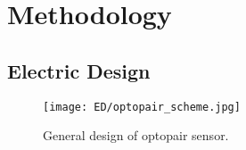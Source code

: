 \chapter{Methodology}
\label{chapter:methodology}


\section{Electric Design}
\begin{figure}[H]
    \centering
    \texttt{[image: ED/optopair\_scheme.jpg]}
    \label{fig:optopair_scheme}
    \caption{General design of optopair sensor.}
  \end{figure}